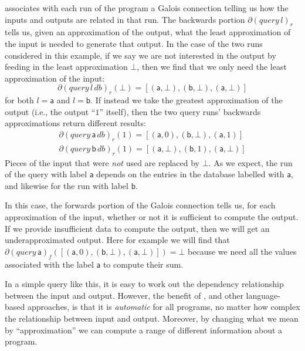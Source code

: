 \begin{example}
  \GPS associates with each run of the program a Galois connection telling us how the inputs and outputs are related in that run. The backwards portion $\partial (\mathit{query}\,l)_r$ tells us, given an approximation of the output, what the least approximation of the input is needed to generate that output. In the case of the two runs considered in this example, if we say we are not interested in the output by feeding in the least approximation $\bot$, then we find that we only need the least approximation of the input:
  \begin{displaymath}
    \partial (\mathit{query}\,l\,\mathit{db})_r(\bot) = [(\mathsf{a},\bot), (\mathsf{b}, \bot), (\mathsf{a}, \bot)]
  \end{displaymath}
  for both $l = \mathsf{a}$ and $l = \mathsf{b}$. If instead we take the greatest approximation of the output (i.e., the output ``$1$'' itself), then the two query runs' backwards approximations return different results:
  \begin{displaymath}
    \begin{array}{l}
      \partial (\mathit{query}\,\mathsf{a}\,\mathit{db})_r(1) = [(\mathsf{a},0), (\mathsf{b},\bot), (\mathsf{a},1)] \\
      \partial (\mathit{query}\,\mathsf{b}\,\mathit{db})_r(1) = [(\mathsf{a},\bot), (\mathsf{b},1), (\mathsf{a},\bot)]
    \end{array}
  \end{displaymath}
  Pieces of the input that were {\em not} used are replaced by $\bot$. As we expect, the run of the query with label $\mathsf{a}$ depends on the entries in the database labelled with $\mathsf{a}$, and likewise for the run with label $\mathsf{b}$.

  In this case, the forwards portion of the Galois connection tells us, for each approximation of the input, whether or not it is sufficient to compute the output. If we provide insufficient data to compute the output, then we will get an underapproximated output. Here for example we will find that $\partial (\mathit{query}\, \mathsf{a})_f([(\mathsf{a},0),(\mathsf{b},\bot),(\mathsf{a},\bot)]) = \bot$ because we need all the values associated with the label $\mathsf{a}$ to compute their sum.

  In a simple query like this, it is easy to work out the dependency relationship between the input and output. However, the benefit of \GPS, and other language-based approaches, is that it is {\em automatic} for all programs, no matter how complex the relationship between input and output. Moreover, by changing what we mean by ``approximation'' we can compute a range of different information about a program.
\end{example}

